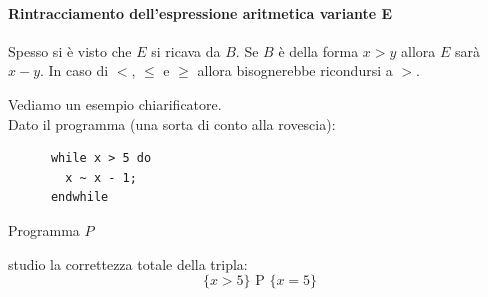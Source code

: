 				      				\paragraph{Rintracciamento dell'espressione aritmetica variante E}
				      				Spesso si è visto che $E$ si ricava da $B$. Se $B$ è della forma $x>y$ 
				      					allora $E$ sarà $x-y$. In caso di $<$, $\leq$ e $\geq$ allora bisognerebbe ricondursi a $>$.
				      				\begin{esempio}
				      					Vediamo un esempio chiarificatore.\\
				      					Dato il programma (una sorta di conto alla rovescia):
				      					\begin{listing}[H]
				      						\begin{lstlisting}
      while x > 5 do
        x ~ x - 1;
      endwhile  
				      						\end{lstlisting}
				      						\caption{Programma $P$}
				      						\label{E:t}
				      					\end{listing}
				      					studio la correttezza totale della tripla:
				      					\[\{x>5\}\mbox{ P }\{x=5\}\]

\end{esempio}
